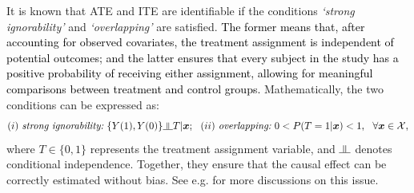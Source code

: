 \documentclass[11pt]{article}
\newcommand{\indep}{\rotatebox[origin=c]{90}{$\models$}}
\newcommand{\bx}{{\boldsymbol x}}
\newcommand{\mX}{\mathcal{X}}
\begin{document}
It is known that ATE and ITE are identifiable if 
the conditions {\it `strong ignorability'} and {\it `overlapping'} are satisfied. \textcolor{black}{The former means that, after accounting for observed covariates, the treatment assignment is   
independent of potential outcomes;
and the latter ensures that every subject in the study has a positive 
probability of receiving either assignment, allowing for meaningful comparisons between treatment and control groups.}  
Mathematically, the two conditions can be expressed as: 
\[
(i) \ \mbox{\it strong ignorability:} 
\ \{Y(1),Y(0)\} \indep T|\bx; \ \ 
(ii) \ \mbox{\it overlapping:} \   0<P(T=1|\bx)<1, \ \  \forall \bx \in \mX,
\]
where $T\in \{0,1\}$ represents the treatment assignment variable, and $\indep$ denotes conditional independence.  
Together, they ensure that the causal effect can be 
correctly estimated without bias.
See e.g. \cite{Guan2019AUF} for more discussions on this issue. 
\end{document}
